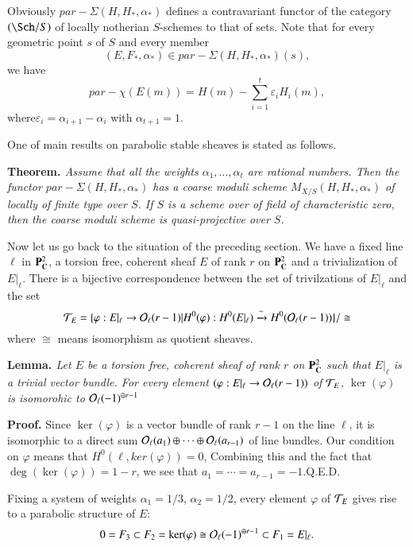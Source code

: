 \noindent
Obviously $par-\Sigma(H, H_{*}, \alpha_{*})$ defines a contravariant functor of the category $(\Sch/S)$ of locally notherian $S$-schemes to that of sets. Note that for every geometric point $s$ of $S$ and every member
$$
(E, F_{*}, \alpha_{*}) \in par-\Sigma(H, H_{*}, \alpha_{*})(s),
$$
we have
$$
par-\chi(E(m))= H(m)- \sum\limits_{i=1}^{t} \varepsilon_{i}H_{i}(m),
$$
where\pageoriginale $\varepsilon_{i}=\alpha_{i+1}-\alpha_{i}$ with $\alpha_{t+1} =1$.

One of main results on parabolic stable sheaves is stated as follows.

\medskip
\noindent
{\bfseries {} Theorem. \label{art12-thm-2.6}} \cite{art12-key7}\textit{ Assume that all the weights $\alpha_{1}, \ldots, \alpha_{t}$ are rational numbers. Then the functor $par-\Sigma(H, H_{*}, \alpha_{*})$ has a coarse moduli scheme $M_{X/S}(H, H_{*}, \alpha_{*})$ of locally of finite type over $S$. If $S$ is a scheme over of field of characteristic zero, then the coarse moduli scheme is quasi-projective over $S$.}

Now let us go back to the situation of the preceding section. We have a fixed line $\ell$ in $\mathbf{P}_{\mathbf{C}}^{2}$, a torsion free, coherent sheaf $E$ of rank $r$ on $\mathbf{P}_{\mathbf{C}}^{2}$ and a trivialization of $E|_{\ell}$. There is a bijective correspondence between the set of trivilzations of $E|_{\ell}$ and the set
$$
\mathcal{T}_{E}=\{\varphi :E|_{\ell} \rightarrow \mathcal{O}_{\ell}(r-1) |H^{0}(\varphi) : H^{0}(E|_{\ell}) \xrightarrow{\sim}H^{0}(\mathcal{O}_{\ell}(r-1))\}/\cong
$$
where $\cong$ means isomorphism as quotient sheaves.

\medskip
\noindent
{\bfseries {} Lemma. \label{art12-lemma.2.7}} \textit{Let $E$ be a torsion free, coherent sheaf of rank $r$ on $\mathbf{P}_{\mathbf{C}}^{2}$ such that $E|_{\ell}$ is a trivial vector bundle. For every element $(\varphi: E|_{\ell} \rightarrow \mathcal{O}_{\ell}(r-1))$ of $\mathcal{T}_{E}$, $\ker(\varphi)$ is isomorohic to $\mathcal{O}_{\ell}(-1)^{\oplus r-1}$} 

\medskip
\noindent
{\bfseries Proof.} Since $\ker(\varphi)$ is a vector bundle of rank $r-1$ on the line $\ell$, it is isomorphic to a direct sum $\mathcal{O}_{\ell}(a_{1}) \oplus \cdots \oplus \mathcal{O}_{\ell}(a_{r-1})$ of line bundles. Our condition on $\varphi$ means that $H^{0}(\ell, ker(\varphi))=0$, Combining this and the fact that $\deg(\ker(\varphi))=1-r$, we see that $a_{1}=\cdots=a_{r-1}=-1$.\hfill Q.E.D. 

Fixing a system of weights $\alpha_{1} =1/3$, $\alpha_{2}=1/2$, every element $\varphi$ of $\mathcal{T}_{E}$
gives rise to a parabolic structure of $E$:
$$
0 =F_{3} \subset F_{2} =\ker(\varphi) \cong \mathcal{O}_{\ell}(-1)^{\oplus r-1} \subset F_{1}=E|_{\ell}.
$$


